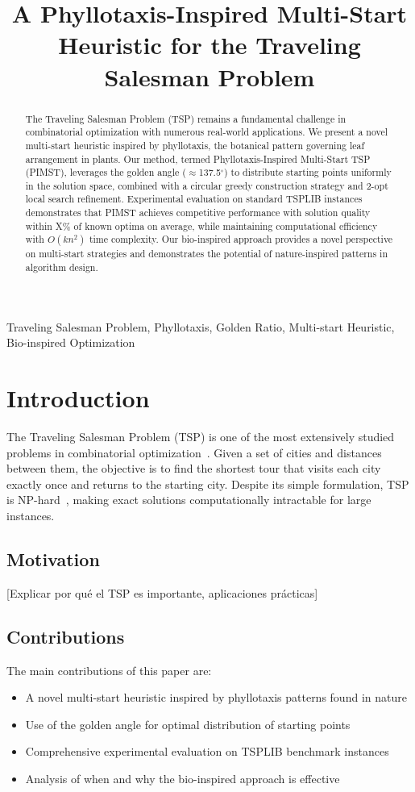 \documentclass[conference]{IEEEtran}
\title{A Phyllotaxis-Inspired Multi-Start Heuristic for the Traveling Salesman Problem}
\author{
\IEEEauthorblockN{[Tu Nombre]}
\IEEEauthorblockA{[Tu Institución]\\
[Tu Email]}
\and
\IEEEauthorblockN{[Coautor si aplica]}
\IEEEauthorblockA{[Institución]\\
[Email]}
}
\begin{document}
\maketitle

\begin{abstract}
The Traveling Salesman Problem (TSP) remains a fundamental challenge in combinatorial optimization with numerous real-world applications. We present a novel multi-start heuristic inspired by phyllotaxis, the botanical pattern governing leaf arrangement in plants. Our method, termed Phyllotaxis-Inspired Multi-Start TSP (PIMST), leverages the golden angle ($\approx$137.5$^{\circ}$) to distribute starting points uniformly in the solution space, combined with a circular greedy construction strategy and 2-opt local search refinement. Experimental evaluation on standard TSPLIB instances demonstrates that PIMST achieves competitive performance with solution quality within X\% of known optima on average, while maintaining computational efficiency with $O(kn^2)$ time complexity. Our bio-inspired approach provides a novel perspective on multi-start strategies and demonstrates the potential of nature-inspired patterns in algorithm design.
\end{abstract}

\begin{IEEEkeywords}
Traveling Salesman Problem, Phyllotaxis, Golden Ratio, Multi-start Heuristic, Bio-inspired Optimization
\end{IEEEkeywords}

\section{Introduction}
The Traveling Salesman Problem (TSP) is one of the most extensively studied problems in combinatorial optimization~\cite{applegate2006tsp}. Given a set of cities and distances between them, the objective is to find the shortest tour that visits each city exactly once and returns to the starting city. Despite its simple formulation, TSP is NP-hard~\cite{garey1979computers}, making exact solutions computationally intractable for large instances.

\subsection{Motivation}
[Explicar por qué el TSP es importante, aplicaciones prácticas]

\subsection{Contributions}
The main contributions of this paper are:
\begin{itemize}
\item A novel multi-start heuristic inspired by phyllotaxis patterns found in nature
\item Use of the golden angle for optimal distribution of starting points
\item Comprehensive experimental evaluation on TSPLIB benchmark instances
\item Analysis of when and why the bio-inspired approach is effective
\end{itemize}
\end{document}
